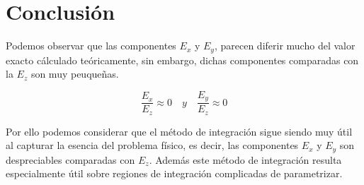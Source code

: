 \section{Conclusión}

Podemos observar que las componentes $E_x$ y $E_y$, parecen diferir mucho del valor exacto cálculado teóricamente, sin embargo, dichas componentes comparadas con la $E_z$ son muy peuqueñas.

\begin{equation}
    \frac{E_x}{E_z} \approx 0
    \quad y \quad
    \frac{E_y}{E_z} \approx 0
\end{equation}

Por ello podemos considerar que el método de integración sigue siendo muy útil al capturar la esencia del problema físico, es decir, las componentes $E_x$ y $E_y$ son despreciables comparadas con $E_z$. Además este método de integración resulta especialmente útil sobre regiones de integración complicadas de parametrizar.